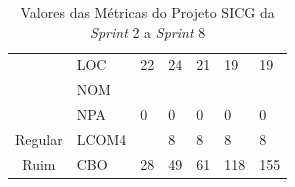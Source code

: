 \begin{table}[H]
\begin{tabular}{|c|l|l|l|l|l|l|}
                                                   & LOC              & 22                & 24                & 21                & 19                & 19                \\ \cline{2-7} 
                                                   & NOM              &                   &                   &                   &                   &                   \\ \cline{2-7} 
                                                   & NPA              & 0                 & 0                 & 0                 & 0                 & 0                 \\ \hline
Regular                                            & LCOM4            &                   & 8                 & 8                 & 8                 & 8                 \\ \hline
Ruim                                               & CBO              & 28                & 49                & 61                & 118               & 155               \\ \hline
\end{tabular}
\caption{Valores das Métricas do Projeto SICG da \textit{Sprint} 2 a \textit{Sprint} 8}
		\label{metricasprint}
\end{table}

